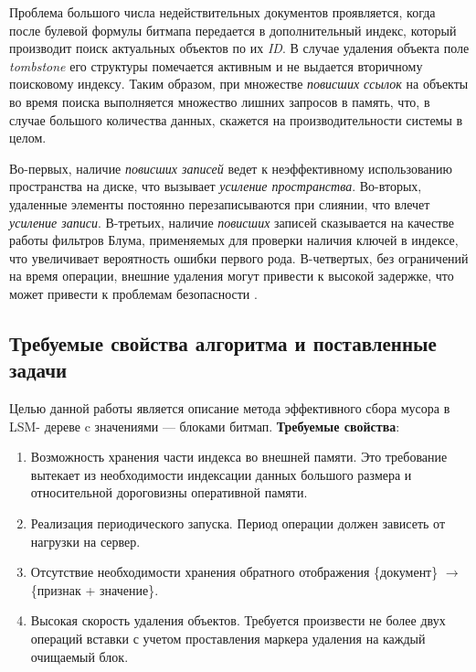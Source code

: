 Проблема большого числа недействительных документов проявляется, когда после
булевой формулы битмапа передается в дополнительный индекс, который производит
поиск актуальных объектов по их \textit{ID}. В случае удаления объекта поле
\textit{tombstone} его структуры помечается активным и не выдается вторичному
поисковому индексу. Таким образом, при множестве \textit{повисших ссылок} на
объекты во время поиска выполняется множество лишних запросов в память, что, в
случае большого количества данных, скажется на производительности системы в целом.

Во-первых, наличие \textit{повисших записей} ведет к неэффективному использованию
пространства на диске, что вызывает \textit{усиление пространства}. Во-вторых,
удаленные элементы постоянно перезаписываются при слиянии, что влечет
\textit{усиление записи}. В-третьих, наличие \textit{повисших} записей сказывается
на качестве работы фильтров Блума, применяемых для проверки наличия ключей в
индексе, что увеличивает вероятность ошибки первого рода. В-четвертых, без
ограничений на время операции, внешние удаления могут привести к высокой задержке,
что может привести к проблемам безопасности \cite{Lethe:2020}.
\label{amplification}

\subsection{Требуемые свойства алгоритма и поставленные задачи}

Целью данной работы является описание метода эффективного сбора мусора в LSM-
дереве c значениями — блоками битмап. \textbf{Требуемые свойства}:
\begin{enumerate}
    \item Возможность хранения части индекса во внешней памяти. Это требование вытекает
    из необходимости индексации данных большого размера и относительной дороговизны
    оперативной памяти.
    \item Реализация периодического запуска. Период операции должен зависеть от нагрузки 
    на сервер.
    \item Отсутствие необходимости хранения обратного отображения \{документ\} $\rightarrow$
    \{признак + значение\}.
    \item Высокая скорость удаления объектов. Требуется произвести не более двух операций
    вставки с учетом проставления маркера удаления на каждый очищаемый блок.
\end{enumerate}

